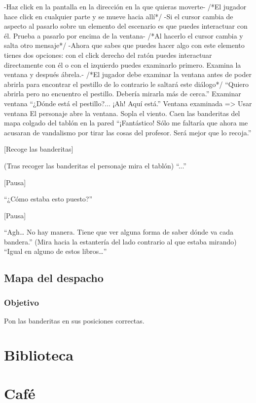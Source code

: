	-Haz click en la pantalla en la dirección en la que quieras moverte-
	/*El jugador hace click en cualquier parte y se mueve hacia allí*/
	-Si el cursor cambia de aspecto al pasarlo sobre un elemento del escenario es que puedes interactuar con él. Prueba a pasarlo por encima de la ventana-
	/*Al hacerlo el cursor cambia y salta otro mensaje*/
	-Ahora que sabes que puedes hacer algo con este elemento tienes dos opciones: con el click derecho del ratón puedes interactuar directamente con él o con el izquierdo puedes examinarlo primero. Examina la ventana y después ábrela.-
	/*El jugador debe examinar la ventana antes de poder abrirla para encontrar el pestillo de lo contrario le saltará este diálogo*/
	``Quiero abrirla pero no encuentro el pestillo. Debería mirarla más de cerca.''
	Examinar ventana
	``¿Dónde está el pestillo?... ¡Ah! Aquí está.''
	Ventana examinada => Usar ventana
	El personaje abre la ventana. Sopla el viento. Caen las banderitas del mapa colgado del tablón en la pared
	``¡Fantástico! Sólo me faltaría que ahora me acusaran de vandalismo por tirar las cosas del profesor. Será mejor que lo recoja.''
	
	[Recoge las banderitas]
	
	(Tras recoger las banderitas el personaje mira el tablón)
	``...''
	
	[Pausa]
	
	``¿Cómo estaba esto puesto?''
	
	[Pausa]
	
	``Agh… No hay manera. Tiene que ver alguna forma de saber dónde va cada bandera.''
	(Mira hacia la estantería del lado contrario al que estaba mirando)
	``Igual en alguno de estos libros…''
	
\subsection{Mapa del despacho}
	\subsubsection{Objetivo}	
	Pon las banderitas en sus posiciones correctas.

\section{Biblioteca}


\section{Café}


